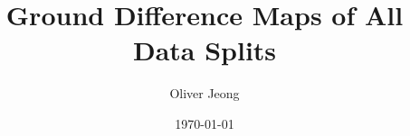 \documentclass{beamer}
\title[Short title]{Ground Difference Maps of All Data Splits} %
\author{Oliver Jeong} %
\institute[UC Berkeley] %
{
University of California \\ %
\medskip
\textit{objeong@berkeley.edu} %
}
\date{\today} %
\begin{document}
\begin{frame}
\titlepage %
\end{frame}




%
%
\end{document}
